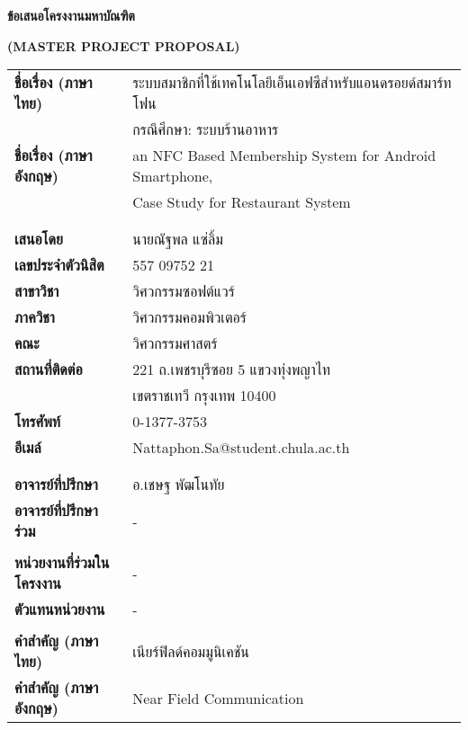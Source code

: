 \documentclass[a4paper]{article}
\begin{document}

\begin{center}
{\huge \bf ข้อเสนอโครงงานมหาบัณฑิต} 
\end{center}

\begin{center}
{\huge \bf (MASTER PROJECT PROPOSAL)} 
\end{center}

\vspace{1cm}
\Large{\noindent\hspace{0.2cm}\setlength{\tabcolsep}{15pt}
\begin{tabular}{l l}    
	\bf ชื่อเรื่อง (ภาษาไทย) 		& ระบบสมาชิกที่ใช้เทคโนโลยีเอ็นเอฟซีสำหรับแอนดรอยด์สมาร์ทโฟน  \\
							& กรณีศึกษา: ระบบร้านอาหาร \\
	\bf ชื่อเรื่อง (ภาษาอังกฤษ)		& an NFC Based Membership System for Android Smartphone,  \\
							& Case Study for Restaurant System \\ 
							& \\
							& \\
	\bf เสนอโดย				& นายณัฐพล แซ่ลิ้ม \\
	\bf เลขประจำตัวนิสิต			& 557 09752 21 \\
	\bf สาขาวิชา				& วิศวกรรมซอฟต์แวร์ \\
	\bf ภาควิชา				& วิศวกรรมคอมพิวเตอร์ \\
	\bf คณะ					& วิศวกรรมศาสตร์ \\
	\bf สถานที่ติดต่อ				& 221 ถ.เพชรบุรีซอย 5 แขวงทุ่งพญาไท \\
							& เขตราชเทวี กรุงเทพ 10400 \\
	\bf โทรศัพท์				& 0-1377-3753 \\
	\bf อีเมล์					&  Nattaphon.Sa@student.chula.ac.th \\
							& \\
							& \\
	\bf อาจารย์ที่ปรึกษา			& อ.เชษฐ พัฒโนทัย \\
	\bf อาจารย์ที่ปรึกษาร่วม		& - \\
							& \\
	\bf หน่วยงานที่ร่วมในโครงงาน	& - \\
	\bf ตัวแทนหน่วยงาน			& - \\
							& \\
	\bf คำสำคัญ (ภาษาไทย)		& เนียร์ฟิลด์คอมมูนิเคชัน \\
	\bf คำสำคัญ (ภาษาอังกฤษ)		& Near Field Communication \\
\end{tabular}
}
\end{document}
